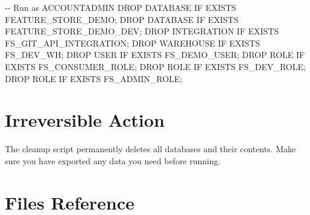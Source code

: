 \documentclass[
  letterpaper,
  DIV=11,
  numbers=noendperiod]{scrreprt}
\newenvironment{Shaded}{\begin{snugshade}}{\end{snugshade}}
\newcommand{\CommentTok}[1]{\textcolor[rgb]{0.37,0.37,0.37}{#1}}
\newcommand{\ControlFlowTok}[1]{\textcolor[rgb]{0.00,0.23,0.31}{#1}}
\newcommand{\FunctionTok}[1]{\textcolor[rgb]{0.28,0.35,0.67}{#1}}
\newcommand{\KeywordTok}[1]{\textcolor[rgb]{0.00,0.23,0.31}{#1}}
\newcommand{\NormalTok}[1]{\textcolor[rgb]{0.00,0.23,0.31}{#1}}
\begin{document}
\begin{Shaded}
\begin{Highlighting}[]
\CommentTok{{-}{-} Run as ACCOUNTADMIN}
\KeywordTok{DROP} \KeywordTok{DATABASE} \ControlFlowTok{IF} \KeywordTok{EXISTS}\NormalTok{ FEATURE\_STORE\_DEMO;}
\KeywordTok{DROP} \KeywordTok{DATABASE} \ControlFlowTok{IF} \KeywordTok{EXISTS}\NormalTok{ FEATURE\_STORE\_DEMO\_DEV;}
\KeywordTok{DROP}\NormalTok{ INTEGRATION }\ControlFlowTok{IF} \KeywordTok{EXISTS}\NormalTok{ FS\_GIT\_API\_INTEGRATION;}
\KeywordTok{DROP}\NormalTok{ WAREHOUSE }\ControlFlowTok{IF} \KeywordTok{EXISTS}\NormalTok{ FS\_DEV\_WH;}
\KeywordTok{DROP} \FunctionTok{USER} \ControlFlowTok{IF} \KeywordTok{EXISTS}\NormalTok{ FS\_DEMO\_USER;}
\KeywordTok{DROP} \KeywordTok{ROLE} \ControlFlowTok{IF} \KeywordTok{EXISTS}\NormalTok{ FS\_CONSUMER\_ROLE;}
\KeywordTok{DROP} \KeywordTok{ROLE} \ControlFlowTok{IF} \KeywordTok{EXISTS}\NormalTok{ FS\_DEV\_ROLE;}
\KeywordTok{DROP} \KeywordTok{ROLE} \ControlFlowTok{IF} \KeywordTok{EXISTS}\NormalTok{ FS\_ADMIN\_ROLE;}
\end{Highlighting}
\end{Shaded}

\hypertarget{irreversible-action}{%
\section{Irreversible Action}\label{irreversible-action}}

The cleanup script permanently deletes all databases and their contents.
Make sure you have exported any data you need before running.

\hypertarget{files-reference}{%
\section{Files Reference}\label{files-reference}}
\end{document}
